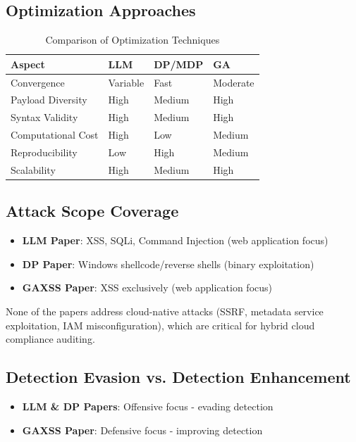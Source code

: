 \documentclass[11pt,conference]{IEEEtran}
\begin{document}
\begin{enumerate}
\subsection{Optimization Approaches}

\begin{table}[h]
\centering
\caption{Comparison of Optimization Techniques}
\begin{tabular}{|l|l|l|l|}
\hline
\textbf{Aspect} & \textbf{LLM} & \textbf{DP/MDP} & \textbf{GA} \\
\hline
Convergence & Variable & Fast & Moderate \\
\hline
Payload Diversity & High & Medium & High \\
\hline
Syntax Validity & High & Medium & High \\
\hline
Computational Cost & High & Low & Medium \\
\hline
Reproducibility & Low & High & Medium \\
\hline
Scalability & High & Medium & High \\
\hline
\end{tabular}
\end{table}

\subsection{Attack Scope Coverage}

\begin{itemize}
    \item \textbf{LLM Paper}: XSS, SQLi, Command Injection (web application focus)
    \item \textbf{DP Paper}: Windows shellcode/reverse shells (binary exploitation)
    \item \textbf{GAXSS Paper}: XSS exclusively (web application focus)
\end{itemize}

None of the papers address cloud-native attacks (SSRF, metadata service exploitation, IAM misconfiguration), which are critical for hybrid cloud compliance auditing.

\subsection{Detection Evasion vs. Detection Enhancement}

\begin{itemize}
    \item \textbf{LLM \& DP Papers}: Offensive focus - evading detection
    \item \textbf{GAXSS Paper}: Defensive focus - improving detection
\end{itemize}


\end{enumerate}
\end{document}
